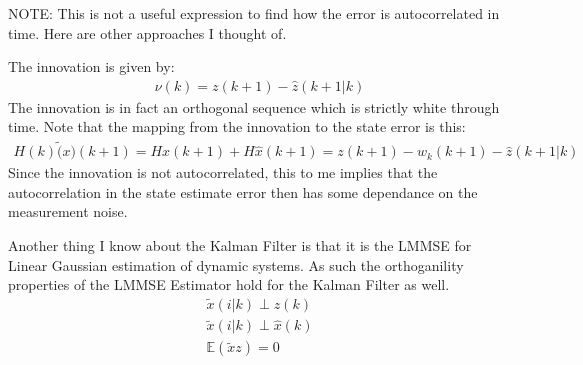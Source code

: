\documentclass{article}
\begin{document}
NOTE: This is not a useful expression to find how the error is autocorrelated in time. Here are other approaches I thought of.

The innovation is given by:
\begin{align*}
\nu(k) = z(k+1) - \hat{z}(k+1|k)
\end{align*}
The innovation is in fact an orthogonal sequence which is strictly white through time. Note that the mapping from the innovation to the state error is this:
\begin{align*}
H(k) \tilde(x)(k+1) = H x(k+1) + H \hat{x}(k+1) = z(k+1) - w_k(k+1) - \hat{z}(k+1|k)
\end{align*}
Since the innovation is not autocorrelated, this to me implies that the autocorrelation in the state estimate error then has some dependance on the measurement noise.

Another thing I know about the Kalman Filter is that it is the LMMSE for Linear Gaussian estimation of dynamic systems. As such the orthoganility properties of the LMMSE Estimator hold for the Kalman Filter as well. 
\begin{align*}
\tilde{x}(i|k) \perp z(k) \\ 
\tilde{x}(i|k) \perp \hat{x}(k) \\ 
\mathbb{E}(\tilde{x} z) = 0
\end{align*}


\clearpage
\end{document}
